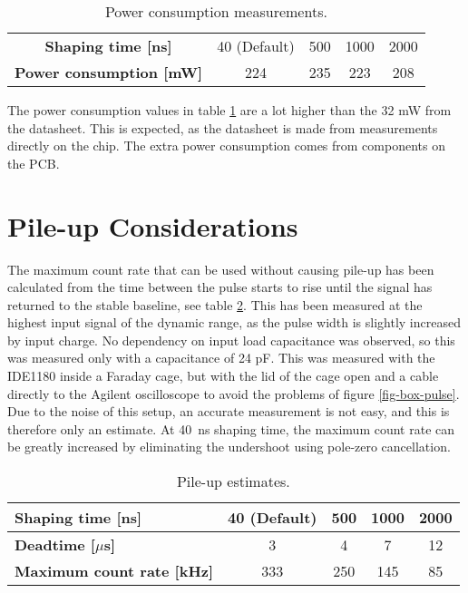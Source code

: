 \documentclass[../main/thesis.tex]{subfiles}
\begin{document}
\begin{table}[h!]
	\begin{center}
		\caption{Power consumption measurements.}
		\label{tab-ide-power}
		\begin{tabular}{ccccc}\toprule
			\textbf{Shaping time [ns]}      & 40 (Default)    & 500    & 1000    & 2000       \\ 
			\textbf{Power consumption [mW]} & 224 & 235 & 223 & 208    \\ \bottomrule
		\end{tabular}
	\end{center}
\end{table}

The power consumption values in table \ref{tab-ide-power} are a lot higher than the 32 mW from the datasheet. This is expected, as the datasheet is made from measurements directly on the chip. The extra power consumption comes from components on the PCB. 

\newpage
\section{Pile-up Considerations}
\label{ide-pileup}

The maximum count rate that can be used without causing pile-up has been calculated from the time between the pulse starts to rise until the signal has returned to the stable baseline, see table \ref{tab-ide-pileup}. This has been measured at the highest input signal of the dynamic range, as the pulse width is slightly increased by input charge. No dependency on input load capacitance was observed, so this was measured only with a capacitance of 24 pF. This was measured with the IDE1180 inside a Faraday cage, but with the lid of the cage open and a cable directly to the Agilent oscilloscope to avoid the problems of figure \ref{fig-box-pulse}. Due to the noise of this setup, an accurate measurement is not easy, and this is therefore only an estimate. At 40~ns shaping time, the maximum count rate can be greatly increased by eliminating the undershoot using pole-zero cancellation. 

\begin{table}[h!]
	\begin{center}
		\caption{Pile-up estimates.}
		\label{tab-ide-pileup}
		\begin{tabular}{lcccc}\toprule
			\textbf{Shaping time [ns]}      & \textbf{40 (Default)}    & \textbf{500}    & \textbf{1000}    & \textbf{2000}       \\ \midrule
			\textbf{Deadtime [$\mu$s]} & 3 & 4 & 7 & 12    \\ 
			\textbf{Maximum count rate [kHz]} & 333 & 250 & 145 & 85 \\\bottomrule
		\end{tabular}
	\end{center}
\end{table}
\end{document}

